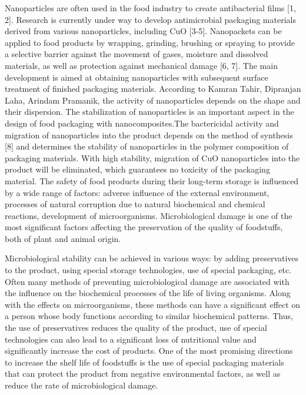 Nanoparticles are often used in the food industry to create
antibacterial films {[}1, 2{]}. Research is currently under way to
develop antimicrobial packaging materials derived from various
nanoparticles, including CuO {[}3-5{]}. Nanopackets can be applied to
food products by wrapping, grinding, brushing or spraying to provide a
selective barrier against the movement of gases, moisture and dissolved
materials, as well as protection against mechanical damage {[}6, 7{]}.
The main development is aimed at obtaining nanoparticles with subsequent
surface treatment of finished packaging materials. According to Kamran
Tahir, Dipranjan Laha, Arindam Pramanik, the activity of nanoparticles
depends on the shape and their dispersion. The stabilization of
nanoparticles is an important aspect in the design of food packaging
with nanocomposites.The bactericidal activity and migration of
nanoparticles into the product depends on the method of synthesis
{[}8{]} and determines the stability of nanoparticles in the polymer
composition of packaging materials. With high stability, migration of
CuO nanoparticles into the product will be eliminated, which guarantees
no toxicity of the packaging material. The safety of food products
during their long-term storage is influenced by a wide range of factors:
adverse influence of the external environment, processes of natural
corruption due to natural biochemical and chemical reactions,
development of microorganisms. Microbiological damage is one of the most
significant factors affecting the preservation of the quality of
foodstuffs, both of plant and animal origin.

Microbiological stability can be achieved in various ways: by adding
preservatives to the product, using special storage technologies, use of
special packaging, etc. Often many methods of preventing microbiological
damage are associated with the influence on the biochemical processes of
the life of living organisms. Along with the effects on microorganisms,
these methods can have a significant effect on a person whose body
functions according to similar biochemical patterns. Thus, the use of
preservatives reduces the quality of the product, use of special
technologies can also lead to a significant loss of nutritional value
and significantly increase the cost of products. One of the most
promising directions to increase the shelf life of foodstuffs is the use
of special packaging materials that can protect the product from
negative environmental factors, as well as reduce the rate of
microbiological damage.

